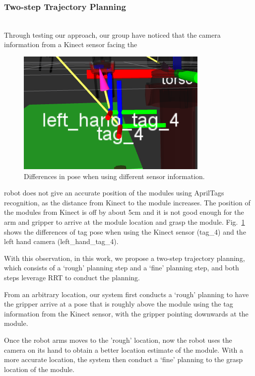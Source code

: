 \subsubsection {Two-step Trajectory Planning}~\\
Through testing our approach, our group have noticed that the camera information from a Kinect sensor facing the 
\begin{figure}
\begin{center}
\vspace{-8pt}
\includegraphics[width=0.45\columnwidth]{pics/kinect_tag_pose3_croped.png}
\caption{Differences in pose when using different sensor information.}
\label{fig:offTagPose}
\vspace{-12pt}
\end{center}
\end{figure}
robot does not give an accurate position of the modules using AprilTags recognition,  
as the distance from Kinect to the module increases. 
The position of the modules from Kinect is off by about 5cm and it is not good enough for the arm and gripper to arrive at the module location and grasp the module. Fig.~\ref{fig:offTagPose} shows the differences of tag pose when using the Kinect sensor (tag\_4) and the left hand camera (left\_hand\_tag\_4).

With this observation, in this work, we propose a two-step trajectory planning, which consists of a `rough' planning step and a `fine' planning step, and both steps leverage RRT to conduct the planning. 

From an arbitrary location, our system first conducts a `rough' planning to have the gripper arrive at a pose that is roughly above the module using the tag information from the Kinect sensor, with the gripper pointing downwards at the module.

Once the robot arms moves to the 'rough' location, now the robot  uses the camera on its hand to obtain a better location estimate of the module. With a more accurate location, the system then conduct a `fine' planning to the grasp location of the module. 

